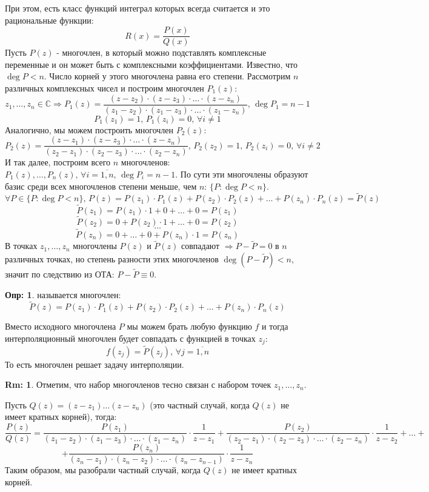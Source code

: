 \documentclass[12pt]{article}
\newcommand{\MC}{\mathbb{C}}
\theoremstyle{definition}
\newtheorem{defn}{Опр:}
\newtheorem{rem}{Rm:}
\newcommand{\wte}[1]{\widetilde{#1}}
\begin{document}
При этом, есть класс функций интеграл которых всегда считается и это рациональные функции: 
$$
	R(x) = \dfrac{P(x)}{Q(x)}
$$
Пусть $P(z)$ - многочлен, в который можно подставлять комплексные переменные и он может быть с комплексными коэффициентами. Известно, что $\deg{P} <n$. Число корней у этого многочлена равна его степени. Рассмотрим $n$ различных комплексных чисел и построим многочлен $P_1(z)$:
$$
	z_1,\dotsc,z_n \in \MC  \Rightarrow P_1(z) = \dfrac{(z - z_2){\cdot}(z- z_3){\cdot}\dotsc {\cdot}(z - z_n)}{(z_1 - z_2){\cdot}(z_1 - z_3){\cdot}\dotsc {\cdot}(z_1 - z_n)}, \, \deg{P_1} = n-1
$$
$$
	P_1(z_1) = 1, \, P_1(z_i) = 0, \, \forall i \neq 1
$$
Аналогично, мы можем построить многочлен $P_2(z)$:
$$
	 P_2(z) = \dfrac{(z - z_1){\cdot}(z- z_3){\cdot}\dotsc {\cdot}(z - z_n)}{(z_2 - z_1){\cdot}(z_2 - z_3){\cdot}\dotsc {\cdot}(z_2 - z_n)}, \, P_2(z_2) = 1, \, P_2(z_i) = 0, \, \forall i \neq 2
$$
И так далее, построим всего $n$ многочленов: $P_1(z), \dotsc, P_n(z), \, \forall i =\overline{1,n}, \, \deg{P_i} = n-1$.  По сути эти многочлены образуют базис среди всех многочленов степени меньше, чем $n$: $\{P \colon \deg{P} < n\}$.
$$
	\forall P \in \{P \colon \deg{P} < n\},\, P(z) = P(z_1){\cdot}P_1(z) + P(z_2){\cdot}P_2(z) +  \dotsc + P(z_n){\cdot}P_n(z) = \wte{P}(z)
$$
$$
	\wte{P}(z_1) = P(z_1){\cdot}1 + 0 + \dotsc + 0 = P(z_1)
$$
$$
	\wte{P}(z_2) = 0 + P(z_2){\cdot}1 + \dotsc + 0  = P(z_2)
$$
$$
	\dotsc
$$
$$
	\wte{P}(z_n) = 0 + \dotsc + 0 + P(z_n){\cdot}1 = P(z_n)
$$
В точках $z_1, \dotsc, z_n$ многочлены $P(z)$ и $\wte{P}(z)$ совпадают $\Rightarrow P - \wte{P} =0 $ в $n$ различных точках, но степень разности этих многочленов $\deg{\left(P - \wte{P}\right)} < n$, значит по следствию из ОТА: $P - \wte{P} \equiv 0$.

\begin{defn}
	 называется многочлен:
	$$
		\wte{P}(z) = P(z_1){\cdot}P_1(z) + P(z_2){\cdot}P_2(z) +  \dotsc + P(z_n){\cdot}P_n(z)
	$$
\end{defn}
Вместо исходного многочлена $P$ мы можем брать любую функцию $f$ и тогда интерполяционный многочлен будет совпадать с функцией в точках $z_j$:
$$
	f(z_j) = \wte{P}(z_j), \, \forall j = \overline{1,n}
$$
То есть многочлен решает задачу интерполяции.
\begin{rem}
	Отметим, что набор многочленов тесно связан с набором точек $z_1,\dotsc, z_n$.
\end{rem}

Пусть $Q(z) = (z- z_1)\dotsc(z - z_n)$ (это частный случай, когда $Q(z)$ не имеет кратных корней), тогда:
$$
	\dfrac{P(z)}{Q(z)} = \dfrac{P(z_1)}{(z_1 - z_2){\cdot}(z_1 - z_3) {\cdot}\dotsc {\cdot}(z_1 - z_n)}{\cdot}\dfrac{1}{z - z_1} + \dfrac{P(z_2)}{(z_2 - z_1){\cdot}(z_2 - z_3) {\cdot}\dotsc {\cdot}(z_2 - z_n)}{\cdot}\dfrac{1}{z - z_2} +\dotsc +
$$
$$
	+ \dfrac{P(z_n)}{(z_n - z_1){\cdot}(z_n - z_2){\cdot}\dotsc{\cdot}(z_n - z_{n-1})}{\cdot}\dfrac{1}{z - z_n}
$$
Таким образом, мы разобрали частный случай, когда $Q(z)$ не имеет кратных корней. 
\end{document}
